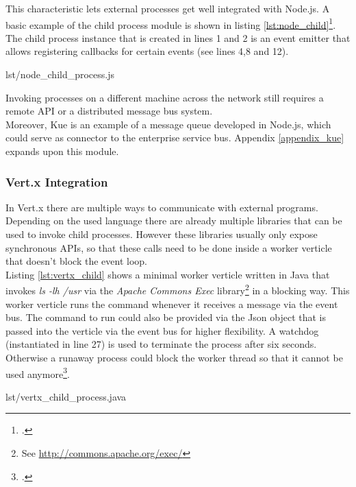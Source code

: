 This characteristic lets external processes get well integrated with Node.js.
A basic example of the child process module is shown in listing \ref{lst:node_child}\footcite[Taken from][]{node_child_process}.
The child process instance that is created in lines 1 and 2 is an event emitter that
allows registering callbacks for certain events (see lines 4,8 and 12).

%
{lst/node_child_process.js}

Invoking processes on a different machine across the network still
requires a remote API or a distributed message bus system.\\

Moreover, Kue is an example of a message queue developed in Node.js, which could serve as connector to the enterprise service bus. Appendix \ref{appendix_kue} expands upon this module.


\subsubsection{Vert.x Integration}
\label{vertx_integration}
In Vert.x there are multiple ways to communicate with external programs.
Depending on the used language there are already multiple libraries that can be
used to invoke child processes. However these libraries usually only expose
synchronous APIs, so that these calls need to be done inside a worker verticle
that doesn't block the event loop.\\
Listing \ref{lst:vertx_child} shows a minimal worker verticle written in Java
that invokes \textit{ls -lh /usr} via the \textit{Apache Commons Exec}
library\footnote{See \url{http://commons.apache.org/exec/}} in a blocking way.
This worker verticle runs the command whenever it receives a message via the event bus.
The command to run could also be provided via the Json object that is passed
into the verticle via the event bus for higher flexibility. A watchdog
(instantiated in line 27) is used to terminate the process after six seconds.
Otherwise a runaway process could block the worker thread so that it cannot be
used anymore\footcite[Cf.][67]{Evi_2007}.

%
{lst/vertx_child_process.java}

